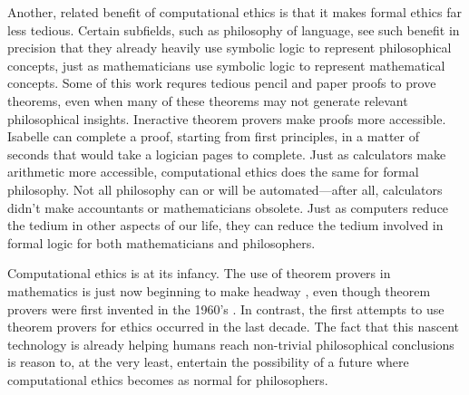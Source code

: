 \begin{isabellebody}
\begin{isamarkuptext}
Another, related benefit of computational ethics is that it makes formal ethics far less tedious. 
Certain subfields, such as philosophy of language, see such benefit in precision that they already heavily 
use symbolic logic to represent philosophical concepts, just as mathematicians use symbolic logic to 
represent mathematical concepts. Some of this work requres tedious pencil and paper proofs to prove 
theorems, even when many of these theorems may not generate relevant philosophical insights. Ineractive 
theorem provers make proofs more accessible. Isabelle can complete a proof, starting from first principles, 
in a matter of seconds that would take a logician pages to complete. Just as calculators make arithmetic 
more accessible, computational ethics does the same for formal philosophy. Not all philosophy can or will 
be automated—after all, calculators didn't make accountants or mathematicians obsolete. Just as computers 
reduce the tedium in other aspects of our life, they can reduce the tedium involved in formal logic for 
both mathematicians and philosophers.%
\end{isamarkuptext}\isamarkuptrue%
%
\isadelimdocument
%
\endisadelimdocument
%
\isatagdocument
%
\isamarkuptrue%
%
\endisatagdocument
{\isafolddocument}%
%
\isadelimdocument
%
\endisadelimdocument
%
\begin{isamarkuptext}%
Computational ethics is at its infancy. The use of theorem provers in mathematics is just now beginning 
to make headway \cite{buzzardvideo}, even though theorem provers were first invented in the 1960's \cite{historyofITP}. In contrast, the first attempts to use theorem 
provers for ethics occurred in the last decade. The fact that this nascent technology is already 
helping humans reach non-trivial philosophical conclusions is reason to, at the very least, entertain 
the possibility of a future where computational ethics becomes as normal for philosophers.


\end{isamarkuptext}
\end{isabellebody}
